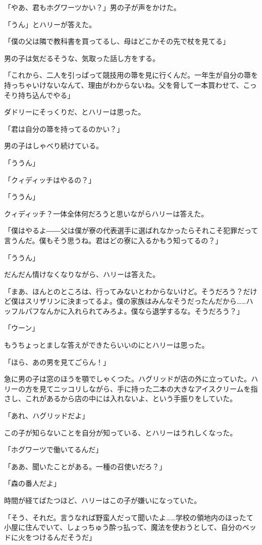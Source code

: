 \documentclass[10pt,a4paper]{article}
\begin{document}
\begin{CJK}{UTF8}{min}
「やあ、君もホグワーツかい？」男の子が声をかけた。

「うん」とハリーが答えた。

「僕の父は隣で教科書を買ってるし、母はどこかその先で杖を見てる」

男の子は気だるそうな、気取った話し方をする。

「これから、二人を引っぱって競技用の箒を見に行くんだ。一年生が自分の箒を持っちゃいけないなんて、理由がわからないね。父を脅して一本買わせて、こっそり持ち込んでやる」

ダドリーにそっくりだ、とハリーは思った。

「君は自分の箒を持ってるのかい？」

男の子はしゃべり続けている。

「ううん」

「クィディッチはやるの？」

「ううん」

クィディッチ？一体全体何だろうと思いながらハリーは答えた。

「僕はやるよ――父は僕が寮の代表選手に選ばれなかったらそれこそ犯罪だって言うんだ。僕もそう思うね。君はどの寮に入るかもう知ってるの？」

「ううん」

だんだん情けなくなりながら、ハリーは答えた。

「まあ、ほんとのところは、行ってみないとわからないけど。そうだろう？だけど僕はスリザリンに決まってるよ。僕の家族はみんなそうだったんだから……ハッフルパフなんかに入れられてみろよ。僕なら退学するな。そうだろう？」

「ウーン」

もうちょっとましな答えができたらいいのにとハリーは思った。

「ほら、あの男を見てごらん！」

急に男の子は窓のほうを顎でしゃくつた。ハグリッドが店の外に立っていた。ハリーの方を見てニッコリしながら、手に持った二本の大きなアイスクリームを指さし、これがあるから店の中には入れないよ、という手振りをしていた。

「あれ、ハグリッドだよ」

この子が知らないことを自分が知っている、とハリーはうれしくなった。

「ホグワーツで働いてるんだ」

「ああ、聞いたことがある。一種の召使いだろ？」

「森の番人だよ」

時間が経てばたつほど、ハリーはこの子が嫌いになっていた。

「そう、それだ。言うなれば野蛮人だって聞いたよ……学校の領地内のほったて小屋に住んでいて、しょっちゅう酔っ払って、魔法を使おうとして、自分のベッドに火をつけるんだそうだ」


\end{CJK}
\end{document}
